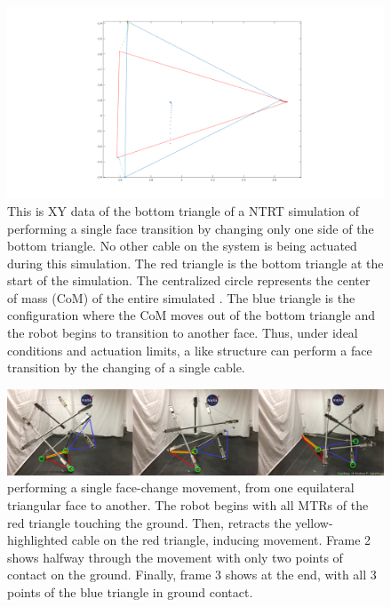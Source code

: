 \begin{figure}[thpb]
      \centering
      \includegraphics[width=0.8\columnwidth]{tex/img/Single_flop_bottom_triangle}
      \caption{This is XY data of the bottom triangle of a NTRT simulation of \SB{} performing a single face transition by changing only one side of the bottom triangle.
      No other cable on the system is being actuated during this simulation.
      The red triangle is the bottom triangle at the start of the simulation. 
      The centralized circle represents the center of mass (CoM) of the entire simulated \SB{}. 
      The blue triangle is the configuration where the CoM moves out of the bottom triangle and the robot begins to transition to another face.
      Thus, under ideal conditions and actuation limits, a \SB{} like structure can perform a face transition by the changing of a single cable.}
      \label{fig:single_flop}
\end{figure}

\begin{figure}[thbp]
    \centering
    \includegraphics[width=1\linewidth]{tex/img/superball_flop_combined_betterlabels}
    \caption{\SB{} performing a single face-change movement, from one equilateral triangular face to another. The robot begins with all MTRs of the red triangle touching the ground. Then, \SB{} retracts the yellow-highlighted cable on the red triangle, inducing movement. Frame 2 shows \SB{} halfway through the movement with only two points of contact on the ground. Finally, frame 3 shows \SB{} at the end, with all 3 points of the blue triangle in ground contact.}
    \label{fig:superball_flop_flat}
\end{figure}

